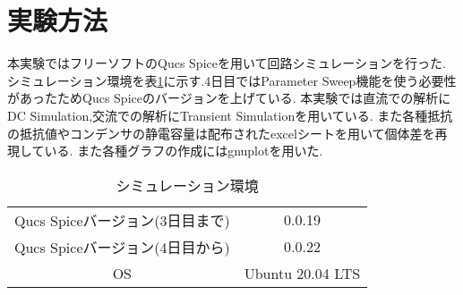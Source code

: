 \section{実験方法}
本実験ではフリーソフトのQucs Spiceを用いて回路シミュレーションを行った.
シミュレーション環境を表\ref{tab:sim_env}に示す.4日目ではParameter Sweep機能を使う必要性があったためQucs Spiceのバージョンを上げている.
本実験では直流での解析にDC Simulation,交流での解析にTransient Simulationを用いている.
また各種抵抗の抵抗値やコンデンサの静電容量は配布されたexcelシートを用いて個体差を再現している.
また各種グラフの作成にはgnuplotを用いた.
\begin{table}[h]
\caption{シミュレーション環境}
\label{tab:sim_env}
\centering
\begin{tabular}{cc}
\hline
Qucs Spiceバージョン(3日目まで)&0.0.19\\
Qucs Spiceバージョン(4日目から)&0.0.22\\
OS&Ubuntu 20.04 LTS\\
\hline
\end{tabular}
\end{table}